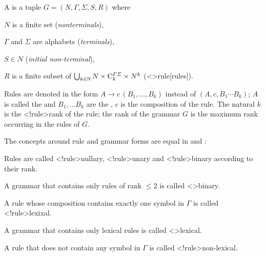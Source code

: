 \documentclass[../../document.tex]{subfiles}
\begin{document}
    \begin{definition}
        A %
        is a tuple \(G=(N, \varGamma, \varSigma, S, R)\) where
        \begin{compactenum}
            \item \(N\) is a finite set (\emph{nonterminals}),
            \item \(\varGamma\) and \(\varSigma\) are alphabets (\emph{terminals}),
            \item \(S \in N\) (\emph{initial non-terminal}),
            \item \(R\) is a finite subset of \(\bigcup_{k \in \mathbb{N}} N \times \mathrm{C}^{\varGamma\varSigma}_k \times N^k\) (<\dcp>{rule}[rules]). %
        \end{compactenum}

        Rules are denoted in the form \(A \to c\,(B_1, \ldots, B_k)\) instead of \((A, c, B_1 \cdots B_k)\); \(A\) is called the  and \(B_1, \ldots B_k\) are the , \(c\) is the composition of the rule.
        The natural \(k\) is the <\dcp!rule>{rank} of the rule; the rank of the grammar \(G\) is the maximum rank occurring in the rules of \(G\).
    \end{definition}

    \begin{definition}
        The concepts around rule and grammar forms are equal in  and :
        \begin{compactitem}
            \item Rules are called <\dcp!rule>{nullary}, <\dcp!rule>{unary} and <\dcp!rule>{binary} according to their rank.
            \item A grammar that contains only rules of rank \(\leq 2\) is called <\dcp>{binary}.
            \item A rule whose composition contains exactly one symbol in \(\varGamma\) is called <\dcp!rule>{lexixal}.
            \item A grammar that contains only lexical rules is called <\dcp>{lexical}.
            \item A rule that does not contain any symbol in \(\varGamma\) is called <\dcp!rule>{non-lexical}.
        \end{compactitem}
    \end{definition}
\end{document}
